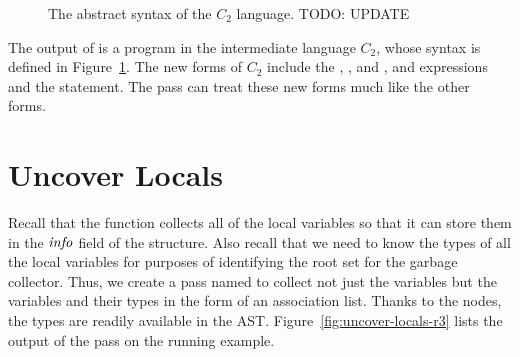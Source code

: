 \documentclass[11pt]{book}
\newcommand{\gray}[1]{{\color{lightgray} #1}}
\begin{document}
\begin{figure}[tp]
\fbox{
  \begin{minipage}{0.96\textwidth}
    \small
\[
\begin{array}{lcl}
\Atm &::=& \gray{ \INT{\Int} \mid \VAR{\Var} \mid \BOOL{\itm{bool}} }\\
\itm{cmp} &::= & \gray{  \key{eq?} \mid \key{<} } \\
\Exp &::= & \gray{ \Atm \mid \READ{} \mid \NEG{\Atm} \mid \ADD{\Atm}{\Atm} }\\
   &\mid& \gray{ \UNIOP{\key{not}}{\Atm} \mid \BINOP{\itm{cmp}}{\Atm}{\Atm}  } \\
   &\mid& (\key{Allocate} \,\itm{int}\,\itm{type})
   \mid \BINOP{\key{'vector-ref}}{\Atm}{\Int}  \\
   &\mid& (\key{Prim}~\key{'vector-set!}\,(\key{list}\,\Atm\,\Int\,\Atm))\\
   &\mid& (\key{GlobalValue} \,\itm{name}) \mid (\key{Void}) \\
\Stmt &::=& \gray{ \ASSIGN{\VAR{\Var}}{\Exp} \mid \RETURN{\Exp} } 
       \mid (\key{Collect} \,\itm{int}) \\
\Tail &::= & \gray{ \RETURN{\Exp} \mid \SEQ{\Stmt}{\Tail} }\\
      &\mid& \gray{ \GOTO{\itm{label}} }\\
      &\mid& \gray{ \IFSTMT{\BINOP{\itm{cmp}}{\Atm}{\Atm}}{\GOTO{\itm{label}}}{\GOTO{\itm{label}}}  }\\
C_2 & ::= & \PROGRAM{\itm{info}}{\CFG{(\itm{label}\,\key{.}\,\Tail)^{+}}}
\end{array}
\]
\end{minipage}
}
\caption{The abstract syntax of the $C_2$ language.
   TODO: UPDATE}
\label{fig:c2-syntax}
\end{figure}

The output of  is a program in the
intermediate language $C_2$, whose syntax is defined in
Figure~\ref{fig:c2-syntax}.  The new forms of $C_2$ include the
, , and , and
 expressions and the  statement.  The
 pass can treat these new forms much like the
other forms.


\section{Uncover Locals}
\label{sec:uncover-locals-r3}

Recall that the  function collects all of the
local variables so that it can store them in the $\mathit{info}$ field of
the  structure. Also recall that we need to know the
types of all the local variables for purposes of identifying the root
set for the garbage collector.  Thus, we create a pass named
 to collect not just the variables but the
variables and their types in the form of an association list. Thanks
to the  nodes, the types are readily available in the
AST. Figure~\ref{fig:uncover-locals-r3} lists the output of the
 pass on the running example.
\end{document}
